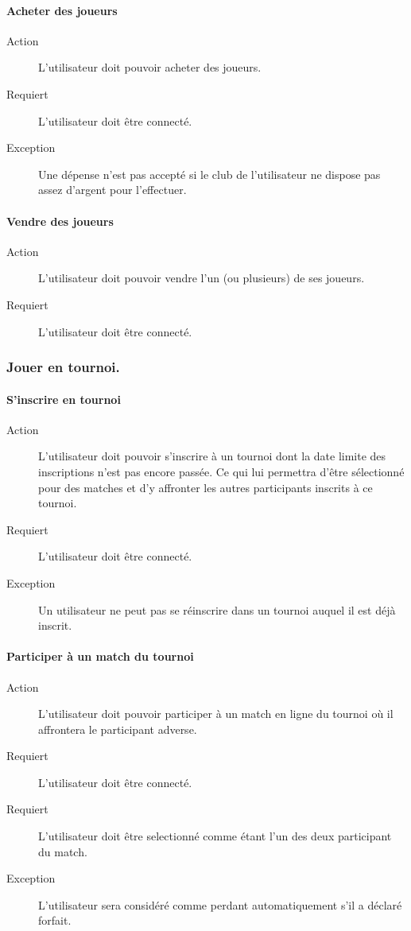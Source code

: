 \documentclass[a4paper]{article}
\begin{document}
\paragraph{Acheter des joueurs}
\begin{description}
\item[Action] L'\gls{utilisateur} doit pouvoir acheter des joueurs.
\item[Requiert] L'\gls{utilisateur} doit être connecté.
\item[Exception] Une dépense n'est pas accepté si le \gls{club} de l'\gls{utilisateur} ne dispose pas assez d'argent pour l'effectuer.
\end{description}
\paragraph{Vendre des joueurs}
\begin{description}
\item[Action] L'\gls{utilisateur} doit pouvoir vendre l'un (ou plusieurs) de ses joueurs.
\item[Requiert] L'\gls{utilisateur} doit être connecté.
\end{description}

\subsubsection{Jouer en tournoi.}
\paragraph{S'inscrire en tournoi}
\begin{description}
\item[Action] L'\gls{utilisateur} doit pouvoir s'inscrire à un tournoi dont la date limite des inscriptions n'est pas encore passée.
Ce qui lui permettra d'être sélectionné pour des matches et d'y affronter les autres participants inscrits à ce tournoi.
\item[Requiert] L'\gls{utilisateur} doit être connecté.
\item[Exception] Un \gls{utilisateur} ne peut pas se réinscrire dans un tournoi auquel il est déjà inscrit.
\end{description} 

\paragraph{Participer à un match du tournoi}
\begin{description}
\item[Action] L'\gls{utilisateur} doit pouvoir participer à un match en ligne du tournoi où il affrontera le participant adverse.
\item[Requiert] L'\gls{utilisateur} doit être connecté.
\item[Requiert] L'\gls{utilisateur} doit être selectionné comme étant l'un des deux participant du match.
\item[Exception] L'\gls{utilisateur} sera considéré comme perdant automatiquement s'il a déclaré forfait.
\end{description}
\end{document}
